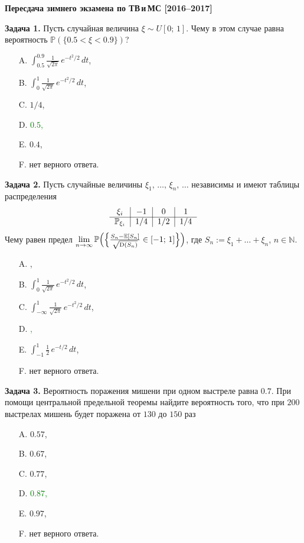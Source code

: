 \documentclass[a4paper, 12pt]{article}
\begin{document}
\begin{center}
    \textbf{\textbf{\large Пересдача зимнего экзамена по ТВ\,и\,МС [2016--2017]}}
\end{center}

\bigskip

\textbf{Задача 1.} Пусть случайная величина $\xi \sim U[0;\,1]$. Чему в этом случае равна вероятность $\mathbb{P}(\{0.5<\xi<0.9\})$?
\begin{itemize}
  \item[A.] $\int_{0.5}^{0.9}\frac{1}{\sqrt{2\pi}}\,e^{-t^2/2}\,dt$,
  \item[B.] $\int_{0}^{1}\frac{1}{\sqrt{2\pi}}\,e^{-t^2/2}\,dt$,
  \item[C.] $1/4$,
  \item[D.] \textcolor{green}{$0.5$,}
  \item[E.] $0.4$,
  \item[F.] нет верного ответа.
\end{itemize}

\medskip

\textbf{Задача 2.} Пусть случайные величины $\xi_1, \, \ldots, \, \xi_n, \, \ldots$ независимы и имеют таблицы распределения
\[
\begin{tabular}{c|c|c|c}
  $\xi_i$                     & $-1$    &  $0$     & $1$   \\ \cline{1-4}
  $\mathbb{P}_{\xi_i}$        & $1/4$   &  $1/2$    & $1/4$   \\
\end{tabular}
\]
Чему равен предел $\lim\limits_{n \rightarrow \infty}\mathbb{P}\Bigl(\Bigl\{\frac{S_n - \mathbb{E}[S_n]}{\sqrt{\mathrm{D}(S_n)}} \in [-1;\,1]\Bigr\}\Bigr)$, где $S_n := \xi_1 + \ldots + \xi_n$, $n \in \mathbb{N}$.
\begin{itemize}
  \item[A.] ,
  \item[B.] $\int_{0}^{1}\frac{1}{\sqrt{2\pi}}\,e^{-t^2/2}\,dt$,
  \item[C.] $\int_{-\infty}^{1}\frac{1}{\sqrt{2\pi}}\,e^{-t^2/2}\,dt$,
  \item[D.] \textcolor{green}{,}
  \item[E.] $\int_{-1}^{1}\frac{1}{2}\,e^{-t/2}\,dt$,
  \item[F.] нет верного ответа.
\end{itemize}

\medskip

\textbf{Задача 3.} Вероятность поражения мишени при одном выстреле равна $0.7$. При помощи центральной предельной теоремы найдите вероятность того, что при $200$ выстрелах мишень будет поражена от $130$  до $150$ раз
\begin{itemize}
  \item[A.] $0.57$,
  \item[B.] $0.67$,
  \item[C.] $0.77$,
  \item[D.] \textcolor{green}{$0.87$,}
  \item[E.] $0.97$,
  \item[F.] нет верного ответа.
\end{itemize}
\end{document}
